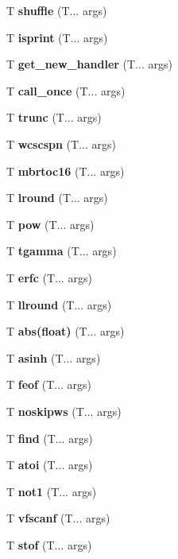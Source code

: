 \begin{DoxyCompactItemize}
\item 
\mbox{\label{random_shuffle}} 
T \textbf{ shuffle} (T... args)
\item 
\mbox{\label{isprint}} 
T \textbf{ isprint} (T... args)
\item 
\mbox{\label{get_new_handler}} 
T \textbf{ get\+\_\+new\+\_\+handler} (T... args)
\item 
\mbox{\label{call_once}} 
T \textbf{ call\+\_\+once} (T... args)
\item 
\mbox{\label{trunc}} 
T \textbf{ trunc} (T... args)
\item 
\mbox{\label{wcscspn}} 
T \textbf{ wcscspn} (T... args)
\item 
\mbox{\label{mbrtoc16}} 
T \textbf{ mbrtoc16} (T... args)
\item 
\mbox{\label{round}} 
T \textbf{ lround} (T... args)
\item 
\mbox{\label{pow}} 
T \textbf{ pow} (T... args)
\item 
\mbox{\label{tgamma}} 
T \textbf{ tgamma} (T... args)
\item 
\mbox{\label{erfc}} 
T \textbf{ erfc} (T... args)
\item 
\mbox{\label{round}} 
T \textbf{ llround} (T... args)
\item 
\mbox{\label{fabs}} 
T \textbf{ abs(float)} (T... args)
\item 
\mbox{\label{asinh}} 
T \textbf{ asinh} (T... args)
\item 
\mbox{\label{feof}} 
T \textbf{ feof} (T... args)
\item 
\mbox{\label{skipws}} 
T \textbf{ noskipws} (T... args)
\item 
\mbox{\label{find}} 
T \textbf{ find} (T... args)
\item 
\mbox{\label{atoi}} 
T \textbf{ atoi} (T... args)
\item 
\mbox{\label{not1}} 
T \textbf{ not1} (T... args)
\item 
\mbox{\label{vfscanf}} 
T \textbf{ vfscanf} (T... args)
\item 
\mbox{\label{stof}} 
T \textbf{ stof} (T... args)
\item 

\end{DoxyCompactItemize}
